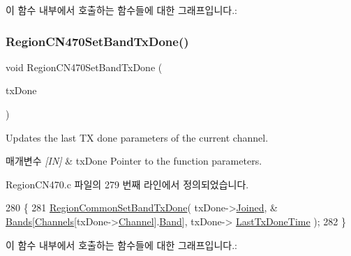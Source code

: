 이 함수 내부에서 호출하는 함수들에 대한 그래프입니다.\+:
\mbox{\label{group___r_e_g_i_o_n_c_n470_gad60aebff1bb6c89423fff84d57b21cb6}} 
\subsubsection{\texorpdfstring{Region\+C\+N470\+Set\+Band\+Tx\+Done()}{RegionCN470SetBandTxDone()}}
{\footnotesize\ttfamily void Region\+C\+N470\+Set\+Band\+Tx\+Done (\begin{DoxyParamCaption}\item[{\mbox{\hyperlink{group___r_e_g_i_o_n_gad0524aa0673c0814a71e7a4f9cade3fc}{Set\+Band\+Tx\+Done\+Params\+\_\+t}} $\ast$}]{tx\+Done }\end{DoxyParamCaption})}



Updates the last TX done parameters of the current channel. 


\begin{DoxyParams}{매개변수}
{\em \mbox{[}\+I\+N\mbox{]}} & tx\+Done Pointer to the function parameters. \\
\hline
\end{DoxyParams}


Region\+C\+N470.\+c 파일의 279 번째 라인에서 정의되었습니다.


\begin{DoxyCode}
280 \{
281     \mbox{\hyperlink{group___r_e_g_i_o_n_c_o_m_m_o_n_ga491dea5590228a0cd33affd71743779c}{RegionCommonSetBandTxDone}}( txDone->\mbox{\hyperlink{structs_set_band_tx_done_params_ac2f6caa0f3b02d2ac5056c3ee7c22652}{Joined}}, &
      \mbox{\hyperlink{_region_c_n470_8c_a5fa033a12327dde1b783f47403b7d859}{Bands}}[\mbox{\hyperlink{_region_c_n470_8c_a23b07a348a0f1b8a5bc01990710126c1}{Channels}}[txDone->\mbox{\hyperlink{structs_set_band_tx_done_params_a1ca6f01ca18afe402de51babe8c95f5e}{Channel}}].\mbox{\hyperlink{structs_channel_params_a724c03aa06953111c3291243831f251b}{Band}}], txDone->
      \mbox{\hyperlink{structs_set_band_tx_done_params_a7316dfb002c4e0015fceeb727020fe5c}{LastTxDoneTime}} );
282 \}
\end{DoxyCode}
이 함수 내부에서 호출하는 함수들에 대한 그래프입니다.\+:
\mbox{\label{group___r_e_g_i_o_n_c_n470_ga0a1e509012a913631470e9801cc972bd}} 
